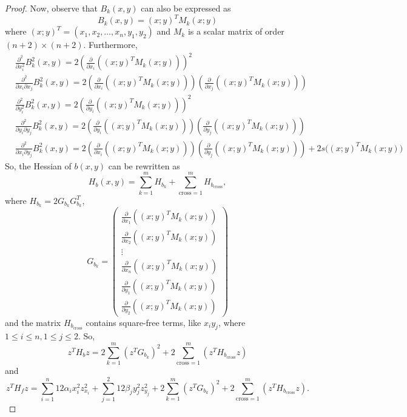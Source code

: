\documentclass[12pt]{elsarticle}
\theoremstyle{definition}
\begin{document}
\begin{proof}
Now, observe that $B_k(x,y)$ can also be expressed as 
\[
B_k(x,y) = (x;y)^TM_k(x;y)
\]
where $(x;y)^T =(x_1,x_2,\dots,x_n,y_1,y_2)$ and $M_k$ is a scalar matrix of order $(n+2)\times (n+2)$. Furthermore,
\[
\begin{aligned}
    &\frac{\partial^2 }{\partial x_i^2}B_k^2(x,y) = 2\left(\frac{\partial}{\partial x_i}((x;y)^TM_k(x;y))\right)^2\\
    &\frac{\partial^2 }{\partial x_i\partial x_j}B_k^2(x,y) = 2\left(\frac{\partial}{\partial x_i}( (x;y)^TM_k(x;y))\right)\left(\frac{\partial}{\partial x_j}( (x;y)^TM_k(x;y))\right)\\
   &\frac{\partial^2 }{\partial y_i^2}B_k^2(x,y) = 2\left(\frac{\partial}{\partial y_i}( (x;y)^TM_k(x;y))\right)^2\\
    &\frac{\partial^2 }{\partial y_i\partial y_j}B_k^2(x,y) = 2\left(\frac{\partial}{\partial y_i}( (x;y)^TM_k(x;y))\right)\left(\frac{\partial}{\partial y_j}( (x;y)^TM_k(x;y))\right)\\
    & \frac{\partial^2 }{\partial x_i\partial y_j}B_k^2(x,y) = 2\left(\frac{\partial}{\partial x_i}((x;y)^TM_k(x;y))\right)\left(\frac{\partial}{\partial y_j}( (x;y)^TM_k(x;y))\right) + 2s\big((x;y)^TM_k(x;y)\big)
\end{aligned}
\]
So, the Hessian of $b(x,y)$ can be rewritten as
\begin{equation}\label{H_bnew}
    H_b(x,y) = \sum_{k=1}^m H_{b_k} + \sum_{\text{cross}=1}^m H_{b_{\text{cross}}} ,
\end{equation}
where $H_{b_k} = 2G_{b_k}G_{b_k}^T$,
\[
G_{b_k}=\begin{pmatrix}
    \frac{\partial}{\partial x_1}((x;y)^TM_k(x;y))\\
    \frac{\partial}{\partial x_2}((x;y)^TM_k(x;y))\\
    \vdots\\
     \frac{\partial}{\partial x_n}((x;y)^TM_k(x;y))\\
      \frac{\partial}{\partial y_1}((x;y)^TM_k(x;y))\\
       \frac{\partial}{\partial y_2}((x;y)^TM_k(x;y))
\end{pmatrix}
\]
and the matrix $H_{b_{\text{cross}}}$ contains square-free terms, like $x_iy_j$, where $1\leq i\leq n, 1\leq j\leq 2$.
So,
\[
    z^TH_bz = 2\sum_{k=1}^m(z^TG_{b_k})^2 + 2\sum_{\text{cross}=1}^m(z^TH_{b_{\text{cross}}}z) 
\]
and
\begin{equation}\label{sos-con}
    z^TH_fz = \sum_{i=1}^n 12\alpha_i x_i^2z_{x_i}^2 + \sum_{j=1}^2 12\beta_j y_j^2z_{y_j}^2 + 2\sum_{k=1}^m(z^TG_{b_k})^2 + 2\sum_{\text{cross}=1}^m(z^TH_{b_{\text{cross}}}z).
\end{equation}


\end{proof}
\end{document}
